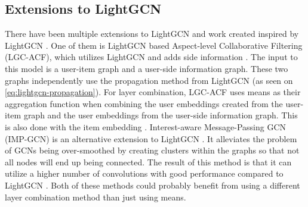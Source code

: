 \subsection{Extensions to LightGCN}
There have been multiple extensions to LightGCN and work created inspired by LightGCN \cite{LGC-ACF,IMP-GCN,SGNN,BiTGCF}.
One of them is LightGCN based Aspect-level Collaborative Filtering (LGC-ACF), which utilizes LightGCN and adds side information \cite{LGC-ACF}.
The input to this model is a user-item graph and a user-side information graph. 
These two graphs independently use the propagation method from LightGCN  (as seen on \autoref{eq:lightgcn-propagation}).
For layer combination, LGC-ACF uses means as their aggregation function when combining the user embeddings created from the user-item graph and the user embeddings from the user-side information graph.
This is also done with the item embedding \cite{LGC-ACF}.
Interest-aware Message-Passing GCN (IMP-GCN) is an alternative extension to LightGCN \cite{IMP-GCN}. 
It alleviates the problem of GCNs being over-smoothed by creating clusters within the graphs so that not all nodes will end up being connected.
The result of this method is that it can utilize a higher number of convolutions with good performance compared to LightGCN \cite{IMP-GCN}. 
Both of these methods could probably benefit from using a different layer combination method than just using means.
